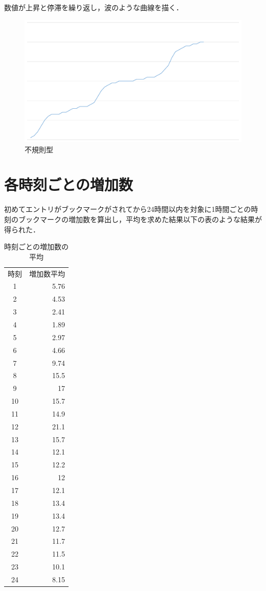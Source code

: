 数値が上昇と停滞を繰り返し，波のような曲線を描く．

\begin{figure}[htb]
\centering
\includegraphics[width=13cm]{g3.pdf}
\caption{不規則型}\label{g3}
\end{figure}

\newpage

\section{各時刻ごとの増加数}
初めてエントリがブックマークがされてから24時間以内を対象に1時間ごとの時刻のブックマークの増加数を算出し，平均を求めた結果以下の表のような結果が得られた．


\begin{table}[htb]
\caption{時刻ごとの増加数の平均}\label{1t}
  \begin{tabular}{cr}
    時刻 & 増加数平均 \\
    1 & 5.76 \\
    2 & 4.53 \\
    3 & 2.41 \\
    4 & 1.89 \\
    5 & 2.97 \\
    6 & 4.66 \\
    7 & 9.74 \\
    8 & 15.5 \\
    9 & 17 \\
    10 &15.7  \\
    11 & 14.9  \\
    12 & 21.1 \\
    13 & 15.7 \\
    14 & 12.1 \\
    15 & 12.2 \\
    16 & 12 \\
    17 & 12.1 \\
    18 & 13.4 \\
    19 & 13.4 \\
    20 & 12.7 \\
    21 & 11.7 \\
    22 & 11.5 \\
    23 & 10.1 \\
    24 & 8.15 \\
  \end{tabular}
\end{table}

